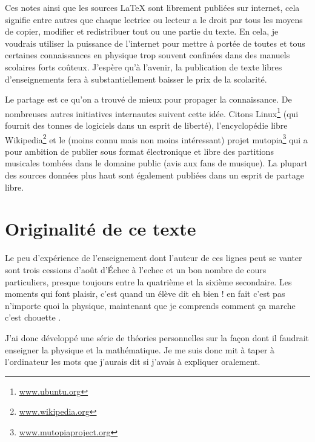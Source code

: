 Ces notes ainsi que les sources \LaTeX{} sont librement publiées sur internet, cela signifie entre autres que chaque lectrice ou lecteur a le droit par tous les moyens de copier, modifier et redistribuer tout ou une partie du texte. En cela, je voudrais utiliser la puissance de l'internet pour mettre à portée de toutes et tous certaines connaissances en physique trop souvent confinées dans des manuels scolaires forts coûteux. J'espère qu'à l'avenir, la publication de texte libres d'enseignements fera à substantiellement baisser le prix de la scolarité.

Le partage est ce qu'on a trouvé de mieux pour propager la connaissance. De nombreuses autres initiatives internautes suivent cette idée. Citons Linux\footnote{\href{www.ubuntu.org}{www.ubuntu.org}} (qui fournit des tonnes de logiciels dans un esprit de liberté), l'encyclopédie libre Wikipedia\footnote{\href{www.wikipedia.org}{www.wikipedia.org}} et le (moins connu mais non moins intéressant) projet mutopia\footnote{\href{www.mutopiaproject.org}{www.mutopiaproject.org}} qui a pour ambition de publier sous format électronique et libre des partitions musicales tombées dans le domaine public (avis aux fans de musique). La plupart des sources données plus haut sont également publiées dans un esprit de partage libre.


					\section{Originalité de ce texte}

Le peu d'expérience de l'enseignement dont l'auteur de ces lignes peut se vanter sont trois cessions d'août d'Échec à l'echec et un bon nombre de cours particuliers, presque toujours entre la quatrième et la sixième secondaire. Les moments qui font plaisir, c'est quand un élève dit \og eh bien ! en fait c'est pas n'importe quoi la physique, maintenant que je comprends comment ça marche c'est chouette \fg.
   
J'ai donc développé une série de théories personnelles sur la façon dont il faudrait enseigner la physique et la mathématique. Je me suis donc mit à taper à l'ordinateur les mots que j'aurais dit si j'avais à expliquer oralement.

